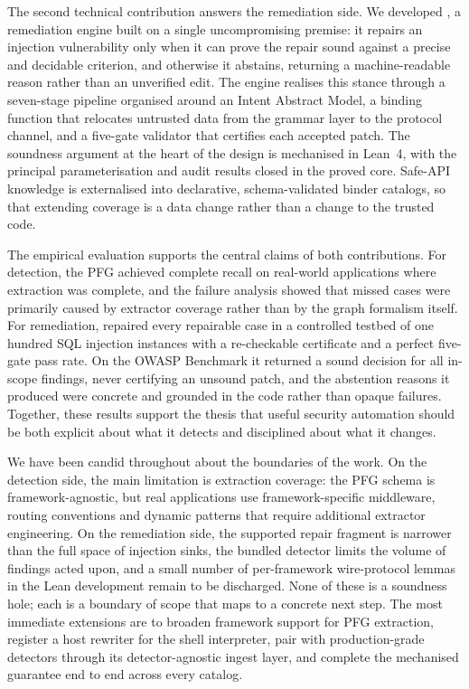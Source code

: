 The second technical contribution answers the remediation side. We developed
\irsam{}, a remediation engine built on a single uncompromising premise: it
repairs an injection vulnerability only when it can prove the repair sound
against a precise and decidable criterion, and otherwise it abstains,
returning a machine-readable reason rather than an unverified edit. The
engine realises this stance through a seven-stage pipeline organised around
an Intent Abstract Model, a binding function that relocates untrusted data
from the grammar layer to the protocol channel, and a five-gate validator
that certifies each accepted patch. The soundness argument at the heart of
the design is mechanised in Lean~4, with the principal parameterisation and
audit results closed in the proved core. Safe-API knowledge is externalised
into declarative, schema-validated binder catalogs, so that extending
coverage is a data change rather than a change to the trusted code.

The empirical evaluation supports the central claims of both contributions.
For detection, the PFG achieved complete recall on real-world applications
where extraction was complete, and the failure analysis showed that missed
cases were primarily caused by extractor coverage rather than by the graph
formalism itself. For remediation, \irsam{} repaired every repairable case in
a controlled testbed of one hundred SQL injection instances with a
re-checkable certificate and a perfect five-gate pass rate. On the OWASP
Benchmark it returned a sound decision for all in-scope findings, never
certifying an unsound patch, and the abstention reasons it produced were
concrete and grounded in the code rather than opaque failures. Together,
these results support the thesis that useful security automation should be
both explicit about what it detects and disciplined about what it changes.

We have been candid throughout about the boundaries of the work. On the
detection side, the main limitation is extraction coverage: the PFG schema is
framework-agnostic, but real applications use framework-specific middleware,
routing conventions and dynamic patterns that require additional extractor
engineering. On the remediation side, the supported repair fragment is
narrower than the full space of injection sinks, the bundled detector limits
the volume of findings acted upon, and a small number of per-framework
wire-protocol lemmas in the Lean development remain to be discharged. None
of these is a soundness hole; each is a boundary of scope that maps to a
concrete next step. The most immediate extensions are to broaden framework
support for PFG extraction, register a host rewriter for the shell
interpreter, pair \irsam{} with production-grade detectors through its
detector-agnostic ingest layer, and complete the mechanised guarantee end to
end across every catalog.

